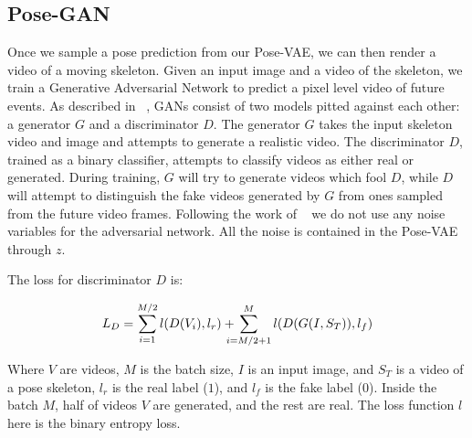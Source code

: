 \subsection{Pose-GAN}

 Once we sample a pose prediction from our Pose-VAE, we can then render a video of a moving skeleton. Given an input image and a
video of the skeleton, we train a Generative Adversarial Network to predict a pixel level video of future events. As described in ~\cite{Wang16}, GANs consist of two models pitted against each other: a generator $G$ and a discriminator $D$. The generator $G$ takes the input skeleton video and image and attempts to generate a realistic video. The discriminator $D$, trained as a binary classifier, attempts to classify videos as either real or generated. During training, $G$ will try to generate videos which fool $D$, while $D$ will attempt to distinguish the fake videos generated by $G$ from ones sampled from the future video frames.
Following the work of ~\cite{Isola16, Vondrick16} we do not use any noise variables for the adversarial network. All the noise is contained in the Pose-VAE through $z$.

The loss for discriminator $D$ is:

\vspace{-.3cm}
\begin{equation}
\begin{split}
L_{D} = \sum_{i=1}^{M/2} l(D(V_{i}),l_r)+\hspace{-.3cm}
\sum_{i=M/2+1}^{M} l(D(G(I, S_{T})),l_f)
\end{split}
\end{equation}
\vspace{-.3cm}

Where $V$ are videos, $M$ is the batch size, $I$ is an input image, and $S_{T}$ is a video of a pose skeleton, $l_r$ is the real label ($1$), and $l_f$ is the fake label ($0$). Inside the batch $M$, half of videos $V$ are generated, and the rest are real. The loss function $l$ here is the binary entropy loss. 


